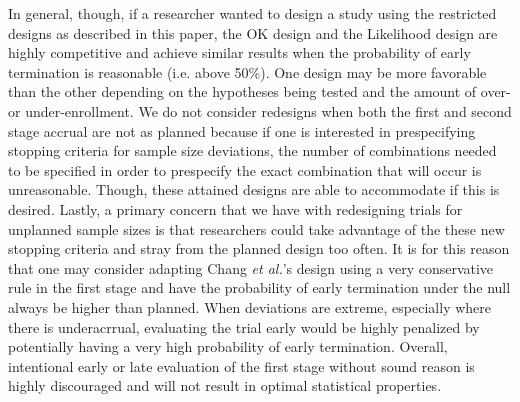 \documentclass[12pt]{report}\usepackage[]{graphicx}\usepackage[]{color}
\newlength{\li}\setlength{\li}{14.48pt}
\newlength{\di}\setlength{\di}{-3.5mm}
\begin{document}
\indent In general, though, if a researcher wanted to design a study using the restricted designs as described in this paper, the OK design and the Likelihood design are highly competitive and achieve similar results when the probability of early termination is reasonable (i.e. above 50\%). One design may be more favorable than the other depending on the hypotheses being tested and the amount of over- or under-enrollment. 
\indent We do not consider redesigns when both the first and second stage accrual are not as planned because if one is interested in prespecifying stopping criteria for sample size deviations, the number of combinations needed to be specified in order to prespecify the exact combination that will occur is unreasonable. Though, these attained designs are able to accommodate if this is desired. Lastly, a primary concern that we have with redesigning trials for unplanned sample sizes is that researchers could take advantage of the these new stopping criteria and stray from the planned design too often. It is for this reason that one may consider adapting Chang \textit{et al.}'s design using a very conservative rule in the first stage and have the probability of early termination under the null always be higher than planned. When deviations are extreme, especially where there is underacrrual, evaluating the trial early would be highly penalized by potentially having a very high probability of early termination. Overall, intentional early or late evaluation of the first stage without sound reason is highly discouraged and will not result in optimal statistical properties. 







%

		
\end{document}
